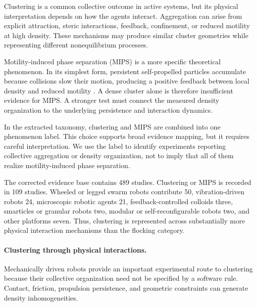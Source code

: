 Clustering is a common collective outcome in active systems,
but its physical interpretation depends on how the agents
interact. Aggregation can arise from explicit attraction,
steric interactions, feedback, confinement, or reduced
motility at high density. These mechanisms may produce
similar cluster geometries while representing different
nonequilibrium processes.

Motility-induced phase separation (MIPS) is a more specific
theoretical phenomenon. In its simplest form, persistent
self-propelled particles accumulate because collisions
slow their motion, producing a positive feedback between
local density and reduced motility
. A dense cluster alone is
therefore insufficient evidence for MIPS. A stronger
test must connect the measured density organization
to the underlying persistence and interaction dynamics.

In the extracted taxonomy, clustering and MIPS are
combined into one phenomenon label. This choice
supports broad evidence mapping, but it requires
careful interpretation. We use the label to identify
experiments reporting collective aggregation or
density organization, not to imply that all of
them realize motility-induced phase separation.

The corrected evidence base contains 489 studies.
Clustering or MIPS is recorded in 109 studies.
Wheeled or legged swarm robots contribute 50,
vibration-driven robots 24, microscopic
robotic agents 21, feedback-controlled
colloids three, smarticles or granular robots
two, modular or self-reconfigurable robots
two, and other platforms seven.
Thus, clustering is represented across
substantially more physical interaction
mechanisms than the flocking category.

\paragraph*{Clustering through physical interactions.}

Mechanically driven robots provide an important
experimental route to clustering because their
collective organization need not be specified
by a software rule. Contact, friction,
propulsion persistence, and geometric constraints
can generate density inhomogeneities.

